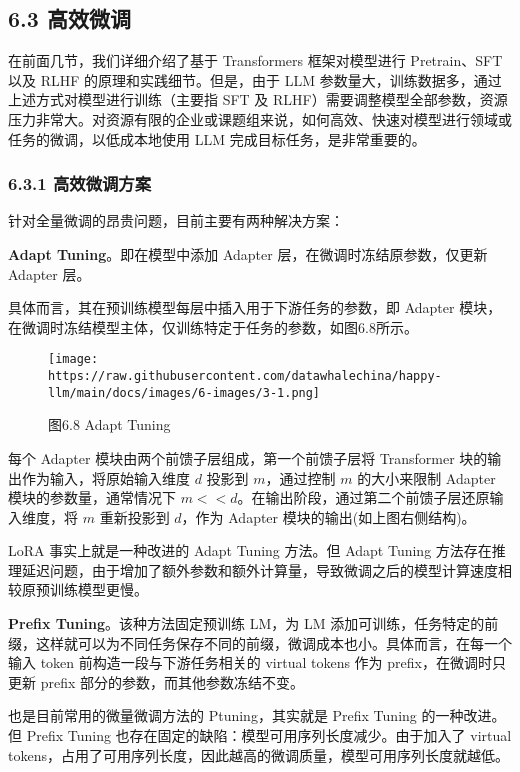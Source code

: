 \documentclass[12pt,a4paper]{book}
\begin{document}
\subsection{6.3 高效微调}\label{ux9ad8ux6548ux5faeux8c03}

在前面几节，我们详细介绍了基于 Transformers 框架对模型进行 Pretrain、SFT
以及 RLHF 的原理和实践细节。但是，由于 LLM
参数量大，训练数据多，通过上述方式对模型进行训练（主要指 SFT 及
RLHF）需要调整模型全部参数，资源压力非常大。对资源有限的企业或课题组来说，如何高效、快速对模型进行领域或任务的微调，以低成本地使用
LLM 完成目标任务，是非常重要的。

\subsubsection{6.3.1
高效微调方案}\label{ux9ad8ux6548ux5faeux8c03ux65b9ux6848}

针对全量微调的昂贵问题，目前主要有两种解决方案：

\textbf{Adapt Tuning}。即在模型中添加 Adapter
层，在微调时冻结原参数，仅更新 Adapter 层。

具体而言，其在预训练模型每层中插入用于下游任务的参数，即 Adapter
模块，在微调时冻结模型主体，仅训练特定于任务的参数，如图6.8所示。

\begin{figure}[htbp]\centering
\texttt{[image: https://raw.githubusercontent.com/datawhalechina/happy-llm/main/docs/images/6-images/3-1.png]}
\caption{图6.8 Adapt Tuning}
\end{figure}

每个 Adapter 模块由两个前馈子层组成，第一个前馈子层将 Transformer
块的输出作为输入，将原始输入维度 \(d\) 投影到 \(m\)，通过控制 \(m\)
的大小来限制 Adapter 模块的参数量，通常情况下
\(m << d\)。在输出阶段，通过第二个前馈子层还原输入维度，将 \(m\)
重新投影到 \(d\)，作为 Adapter 模块的输出(如上图右侧结构)。

LoRA 事实上就是一种改进的 Adapt Tuning 方法。但 Adapt Tuning
方法存在推理延迟问题，由于增加了额外参数和额外计算量，导致微调之后的模型计算速度相较原预训练模型更慢。

\textbf{Prefix Tuning}。该种方法固定预训练 LM，为 LM
添加可训练，任务特定的前缀，这样就可以为不同任务保存不同的前缀，微调成本也小。具体而言，在每一个输入
token 前构造一段与下游任务相关的 virtual tokens 作为
prefix，在微调时只更新 prefix 部分的参数，而其他参数冻结不变。

也是目前常用的微量微调方法的 Ptuning，其实就是 Prefix Tuning
的一种改进。但 Prefix Tuning
也存在固定的缺陷：模型可用序列长度减少。由于加入了 virtual
tokens，占用了可用序列长度，因此越高的微调质量，模型可用序列长度就越低。
\end{document}
